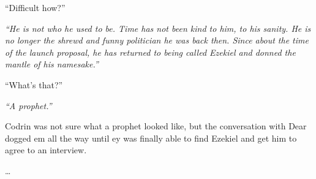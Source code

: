 ``Difficult how?''

\emph{``He is not who he used to be. Time has not been kind to him, to his sanity. He is no longer the shrewd and funny politician he was back then. Since about the time of the launch proposal, he has returned to being called Ezekiel and donned the mantle of his namesake.''}

``What's that?''

\emph{``A prophet.''}

Codrin was not sure what a prophet looked like, but the conversation with Dear dogged em all the way until ey was finally able to find Ezekiel and get him to agree to an interview.

\ldots{}
